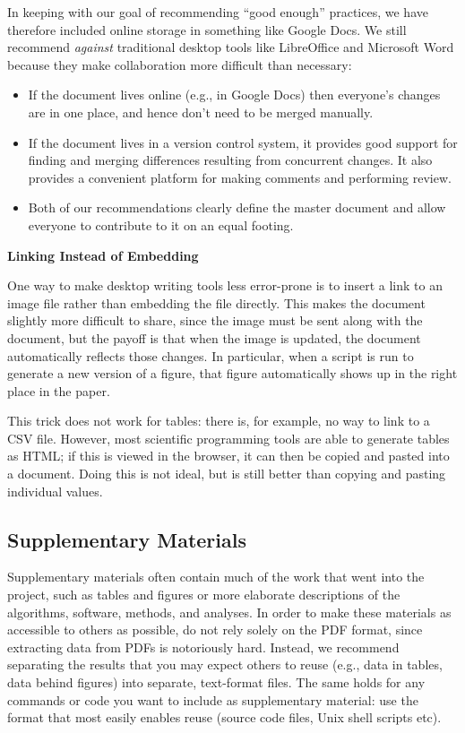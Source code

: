 \documentclass[10pt]{article}
\begin{document}
In keeping with our goal of recommending ``good enough'' practices, we
have therefore included online storage in something like Google Docs. We
still recommend \emph{against} traditional desktop tools like
LibreOffice and Microsoft Word because they make collaboration more
difficult than necessary:

\begin{itemize}
\item
  If the document lives online (e.g., in Google Docs) then everyone's
  changes are in one place, and hence don't need to be merged manually.
\item
  If the document lives in a version control system, it provides good
  support for finding and merging differences resulting from concurrent
  changes. It also provides a convenient platform for making comments
  and performing review.
\item
  Both of our recommendations clearly define the master document and
  allow everyone to contribute to it on an equal footing.
\end{itemize}

\begin{framed}
\noindent \textbf{Linking Instead of Embedding}

One way to make desktop writing tools less error-prone is to insert a
link to an image file rather than embedding the file directly.  This
makes the document slightly more difficult to share, since the image
must be sent along with the document, but the payoff is that when the
image is updated, the document automatically reflects those changes.
In particular, when a script is run to generate a new version of a
figure, that figure automatically shows up in the right place in the
paper.

This trick does not work for tables: there is, for example, no way to
link to a CSV file.  However, most scientific programming tools are
able to generate tables as HTML; if this is viewed in the browser, it
can then be copied and pasted into a document.  Doing this is not
ideal, but is still better than copying and pasting individual values.

\end{framed}

\subsection*{Supplementary Materials}

Supplementary materials often contain much of the work that went into
the project, such as tables and figures or more elaborate descriptions
of the algorithms, software, methods, and analyses. In order to make
these materials as accessible to others as possible, do not rely
solely on the PDF format, since extracting data from PDFs is
notoriously hard.  Instead, we recommend separating the results that
you may expect others to reuse (e.g., data in tables, data behind
figures) into separate, text-format files. The same holds for any
commands or code you want to include as supplementary material: use
the format that most easily enables reuse (source code files, Unix
shell scripts etc).
\end{document}
